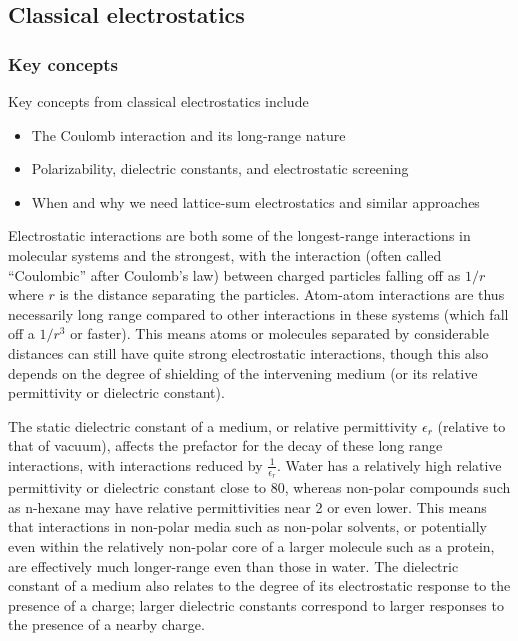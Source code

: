 \documentclass[9pt,bestpractices]{livecoms}
\begin{document}
\subsection{Classical electrostatics}
\label{sec:classical_electrostatics}
\subsubsection{Key concepts}
Key concepts from classical electrostatics include
\begin{itemize}
\item The Coulomb interaction and its long-range nature
\item Polarizability, dielectric constants, and electrostatic screening
\item When and why we need lattice-sum electrostatics and similar approaches
\end{itemize}


Electrostatic interactions are both some of the longest-range interactions in molecular systems and the strongest, with the interaction (often called
``Coulombic'' after Coulomb's law) between charged particles falling off as $1/r$ where $r$ is the distance separating the particles. 
Atom-atom interactions are thus necessarily long range compared to other interactions in these systems (which fall off a $1/r^3$ or faster).  
This means atoms or molecules separated by considerable distances can still have quite strong electrostatic interactions, though this also depends on the degree of shielding of the intervening medium (or its relative permittivity or dielectric constant).

The static dielectric constant of a medium, or relative permittivity $\epsilon_r$ (relative to that of vacuum), affects the prefactor for the decay of these long range interactions, with interactions reduced by $\frac{1}{\epsilon_r}$. 
Water has a relatively high relative permittivity or dielectric constant close to 80, whereas non-polar compounds such as n-hexane may have relative permittivities near 2 or even lower. 
This means that interactions in non-polar media such as non-polar solvents, or potentially even within the relatively non-polar core of a larger molecule such as a protein, are effectively much longer-range even than those in water. 
The dielectric constant of a medium also relates to the degree of its electrostatic response to the presence of a charge; larger dielectric constants correspond to larger responses to the presence of a nearby charge.
\end{document}
